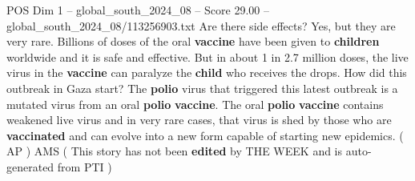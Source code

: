 \begin{textsample}{POS Dim 1 – global\_south\_2024\_08 – Score 29.00 – global\_south\_2024\_08/113256903.txt}
Are there side effects?
Yes, but they are very rare.
Billions of doses of the oral \textbf{vaccine} have been given to \textbf{children} worldwide and it is safe and effective.
But in about 1 in 2.7 million doses, the live virus in the \textbf{vaccine} can paralyze the \textbf{child} who receives the drops.
How did this outbreak in Gaza start?
The \textbf{polio} virus that triggered this latest outbreak is a mutated virus from an oral \textbf{polio} \textbf{vaccine}.
The oral \textbf{polio} \textbf{vaccine} contains weakened live virus and in very rare cases, that virus is shed by those who are \textbf{vaccinated} and can evolve into a new form capable of starting new epidemics. ( AP ) AMS ( This story has not been \textbf{edited} by THE WEEK and is auto-generated from PTI )

\end{textsample}
